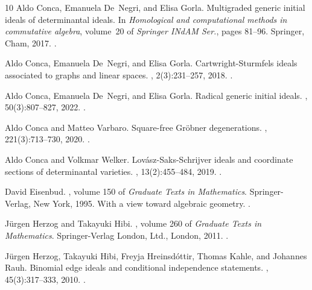 \documentclass{amsart}
\theoremstyle{definition}
\numberwithin{equation}{section}
\begin{document}
\begin{thebibliography}{10}
Aldo Conca, Emanuela De~Negri, and Elisa Gorla.
\newblock Multigraded generic initial ideals of determinantal ideals.
\newblock In {\em Homological and computational methods in commutative
  algebra}, volume~20 of {\em Springer INdAM Ser.}, pages 81--96. Springer,
  Cham, 2017.
\newblock \href {https://doi.org/10.1007/978-3-319-61943-9_5}
  {}.

Aldo Conca, Emanuela De~Negri, and Elisa Gorla.
\newblock Cartwright-{S}turmfels ideals associated to graphs and linear spaces.
, 2(3):231--257, 2018.
\newblock \href {https://doi.org/10.4171/JCA/2-3-2}
  {}.

Aldo Conca, Emanuela De~Negri, and Elisa Gorla.
\newblock Radical generic initial ideals.
, 50(3):807--827, 2022.
\newblock \href {https://doi.org/10.1007/s10013-022-00551-w}
  {}.

Aldo Conca and Matteo Varbaro.
\newblock Square-free {G}r\"{o}bner degenerations.
, 221(3):713--730, 2020.
\newblock \href {https://doi.org/10.1007/s00222-020-00958-7}
  {}.

Aldo Conca and Volkmar Welker.
\newblock Lov\'{a}sz-{S}aks-{S}chrijver ideals and coordinate sections of
  determinantal varieties.
, 13(2):455--484, 2019.
\newblock \href {https://doi.org/10.2140/ant.2019.13.455}
  {}.

David Eisenbud.
, volume 150 of {\em Graduate Texts in
  Mathematics}.
\newblock Springer-Verlag, New York, 1995.
\newblock With a view toward algebraic geometry.
\newblock \href {https://doi.org/10.1007/978-1-4612-5350-1}
  {}.

J\"urgen Herzog and Takayuki Hibi.
, volume 260 of {\em Graduate Texts in
  Mathematics}.
\newblock Springer-Verlag London, Ltd., London, 2011.
\newblock \href {https://doi.org/10.1007/978-0-85729-106-6}
  {}.

J\"{u}rgen Herzog, Takayuki Hibi, Freyja Hreinsd\'{o}ttir, Thomas Kahle, and
  Johannes Rauh.
\newblock Binomial edge ideals and conditional independence statements.
, 45(3):317--333, 2010.
\newblock \href {https://doi.org/10.1016/j.aam.2010.01.003}
  {}.


\end{thebibliography}
\end{document}
